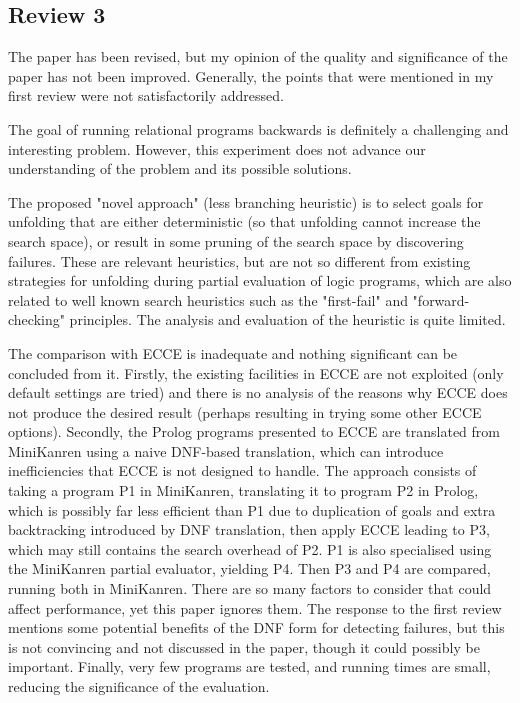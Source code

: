 \subsection*{Review 3}
The paper has been revised, but my opinion of the quality and significance of the paper has not been improved.  Generally, the points that were mentioned in my first review were not satisfactorily addressed.

The goal of running relational programs backwards is definitely a challenging and interesting problem.  However, this experiment does not advance our understanding of the problem and its possible solutions.

The proposed "novel approach" (less branching heuristic) is to select goals for unfolding that are either deterministic (so that unfolding cannot increase the search space), or result in some pruning of the search space by discovering failures.  These are relevant heuristics, but are not so different from existing strategies for unfolding during partial evaluation of logic programs, which are also related to well known search heuristics such as the "first-fail" and "forward-checking" principles. The analysis and evaluation of the heuristic is quite limited.

The comparison with ECCE is inadequate and nothing significant can be concluded from it.  Firstly, the existing facilities in ECCE are not exploited (only default settings are tried) and there is no analysis of the reasons why ECCE does not produce the desired result (perhaps resulting in trying some other ECCE options).  Secondly, the Prolog programs presented to ECCE are translated from MiniKanren using a naive DNF-based translation, which can introduce inefficiencies that ECCE is not designed to handle.  The approach consists of taking a program P1 in MiniKanren, translating it to program P2 in Prolog, which is possibly far less efficient than P1 due to duplication of goals and extra backtracking introduced by DNF translation, then apply ECCE leading to P3, which may still contains the search overhead of P2.  P1 is also specialised using the MiniKanren partial evaluator, yielding P4. Then P3 and P4 are compared, running both in MiniKanren. There are so many factors to consider that could affect performance, yet this paper ignores them. The response to the first review mentions some potential benefits of the DNF form for detecting failures, but this is not convincing and not discussed in the paper, though it could possibly be important. Finally, very few programs are tested, and running times are small, reducing the significance of the evaluation.

